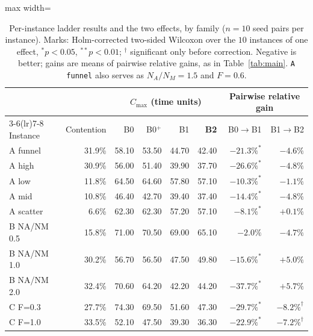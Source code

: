 \documentclass[preprint,review,12pt,authoryear]{elsarticle}
\newcommand{\NCases}{10}
\newcommand{\NSeeds}{10}
\begin{document}
\begin{table}[!htbp]
\caption{Per-instance ladder results and the two effects, by family ($n=\NSeeds$ seed pairs per instance). Marks: Holm-corrected two-sided Wilcoxon over the $\NCases$ instances of one effect, $^{*}p<0.05$, $^{**}p<0.01$; $^{\dagger}$ significant only before correction. Negative is better; gains are means of pairwise relative gains, as in Table~\ref{tab:main}.
\texttt{A funnel} also serves as $N_A/N_M=1.5$ and $F=0.6$.}
\label{tab:bytag}
\small
\begin{adjustbox}{max width=\linewidth}\begin{tabular}{@{}lrrrrrrr@{}}
\toprule
& & \multicolumn{4}{c}{$C_{\max}$ (time units)} & \multicolumn{2}{c}{Pairwise relative gain} \\
\cmidrule(lr){3-6}\cmidrule(lr){7-8}
Instance & Contention & B0 & B0$^{+}$ & B1 & \textbf{B2} & B0$\rightarrow$B1 & B1$\rightarrow$B2 \\
\midrule
A funnel & 31.9\% & 58.10 & 53.50 & 44.70 & 42.40 & $-21.3\%^{*}$ & $-4.6\%$ \\
A high & 30.9\% & 56.00 & 51.40 & 39.90 & 37.70 & $-26.6\%^{*}$ & $-4.8\%$ \\
A low & 11.8\% & 64.50 & 64.60 & 57.80 & 57.10 & $-10.3\%^{*}$ & $-1.1\%$ \\
A mid & 10.8\% & 46.40 & 42.70 & 39.40 & 37.40 & $-14.4\%^{*}$ & $-4.8\%$ \\
A scatter & 6.6\% & 62.30 & 62.30 & 57.20 & 57.10 & $-8.1\%^{*}$ & $+0.1\%$ \\
\midrule
B NA/NM 0.5 & 15.8\% & 71.00 & 70.50 & 69.00 & 65.10 & $-2.0\%$ & $-4.7\%$ \\
B NA/NM 1.0 & 30.2\% & 56.70 & 56.50 & 47.50 & 49.80 & $-15.6\%^{*}$ & $+5.0\%$ \\
B NA/NM 2.0 & 32.4\% & 70.60 & 64.20 & 42.20 & 44.20 & $-37.7\%^{*}$ & $+5.7\%$ \\
\midrule
C F=0.3 & 27.7\% & 74.30 & 69.50 & 51.60 & 47.30 & $-29.7\%^{*}$ & $-8.2\%^{\dagger}$ \\
C F=1.0 & 33.5\% & 52.10 & 47.50 & 39.30 & 36.30 & $-22.9\%^{*}$ & $-7.2\%^{\dagger}$ \\
\bottomrule
\end{tabular}\end{adjustbox}
\end{table}
\end{document}
